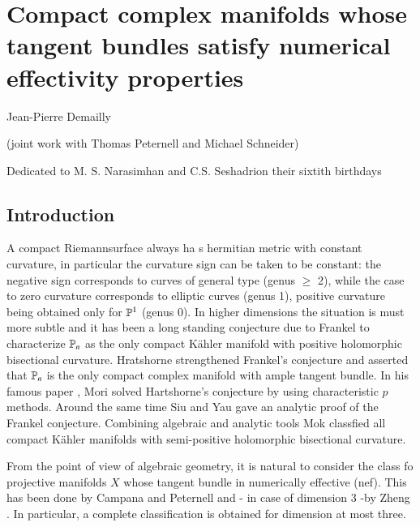 \chapter{Compact complex manifolds whose tangent bundles satisfy numerical effectivity properties}\label{chap5}

\begin{center}
Jean-Pierre Demailly

\smallskip
(joint work with Thomas Peternell and Michael Schneider)

\medskip
Dedicated to M. S. Narasimhan and C.S. Seshadri\break on their sixtith birthdays
\end{center}


\setcounter{pageoriginal}{66}
\setcounter{section}{-1}
\section{Introduction}\label{chap5-sec-0}
A compact Riemann\pageoriginale surface always ha s hermitian metric with constant curvature, in particular the curvature sign can be taken to be constant: the negative sign corresponds to curves of general type (genus $\geq$ 2), while the case to zero curvature corresponds to elliptic curves (genus 1), positive curvature being obtained only for $\mathbb{P}^{1}$ (genus 0). In higher dimensions the situation is must more subtle and it has been a long standing conjecture due to Frankel to characterize $\mathbb{P}_{n}$ as the only compact K\"ahler manifold with positive holomorphic bisectional curvature. Hratshorne strengthened Frankel's conjecture and asserted that $\mathbb{P}_{n}$ is the only compact complex manifold with ample tangent bundle. In his famous paper \cite{chap5-keyMo79}, Mori solved Hartshorne's conjecture by using characteristic $p$ methods. Around the same time Siu and Yau \cite{SY80} gave an analytic proof of the Frankel conjecture. Combining algebraic and analytic tools Mok \cite{chap5-keyMk88} classfied all compact K\"ahler manifolds with semi-positive holomorphic bisectional curvature. 

From the point of view of algebraic geometry, it is natural to consider the class fo projective manifolds $X$ whose tangent bundle in numerically effective (nef). This has been done by Campana and Peternell \cite{chap5-keyCP91} and - in case of dimension 3 -by Zheng \cite{chap5-keyZh90}. In particular, a complete classification is obtained for dimension at most three.

